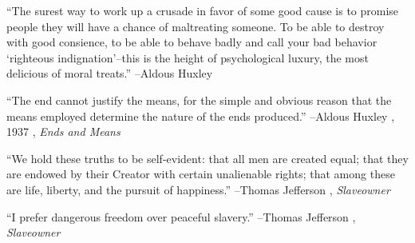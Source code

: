 \documentclass{article}%
\begin{document}
\linebreak%
\vspace{1mm}%
\begin{minipage}{\textwidth}%
\flushleft%
“The surest way to work up a crusade in favor of some good cause is to promise people they will have a chance of maltreating someone. To be able to destroy with good consience, to be able to behave badly and call your bad behavior ‘righteous indignation’–this is the height of psychological luxury, the most delicious of moral treats.”%
\linebreak%
\vspace{1mm}%
–Aldous Huxley%
\linebreak%
\vspace{1mm}%
\end{minipage}%
\linebreak%
\vspace{1mm}%
\begin{minipage}{\textwidth}%
\flushleft%
“The end cannot justify the means, for the simple and obvious reason that the means employed determine the nature of the ends produced.”%
\linebreak%
\vspace{1mm}%
–Aldous Huxley%
, 1937%
, \textit{Ends and Means}%
\linebreak%
\vspace{1mm}%
\end{minipage}%
\linebreak%
\vspace{1mm}%
\begin{minipage}{\textwidth}%
\flushleft%
“We hold these truths to be self{-}evident: that all men are created equal; that they are endowed by their Creator with certain unalienable rights; that among these are life, liberty, and the pursuit of happiness.”%
\linebreak%
\vspace{1mm}%
–Thomas Jefferson%
, \textit{Slaveowner}%
\linebreak%
\vspace{1mm}%
\end{minipage}%
\linebreak%
\vspace{1mm}%
\begin{minipage}{\textwidth}%
\flushleft%
“I prefer dangerous freedom over peaceful slavery.”%
\linebreak%
\vspace{1mm}%
–Thomas Jefferson%
, \textit{Slaveowner}%
\linebreak%
\vspace{1mm}%
\end{minipage}%
\end{document}
